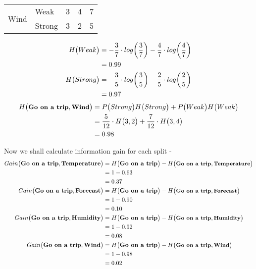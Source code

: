 \documentclass[11pt]{article}
\begin{document}
\begin{enumerate}
\begin{table}[!ht]
\begin{tabular}{|l|l|l|l|l|}
		\multirow{2}{*}{Wind}        & Weak          & 3                    & 4                   & 7                               \\ \cline{2-5} 
		& Strong        & 3                    & 2                   & 5                               \\ \hline
	\end{tabular}
\end{table}	
\begin{align*}
H \big(\small Weak\big) &= - \frac{3}{7} \cdot log \bigg(\frac{3}{7} \bigg) - \frac{4}{7} \cdot log \bigg(\frac{4}{7} \bigg) \\
&= 0.99 \\ 
H \big(\small Strong\big) &= - \frac{3}{5} \cdot log \bigg(\frac{3}{5} \bigg) - \frac{2}{5} \cdot log \bigg(\frac{2}{5} \bigg) \\
&= 0.97 
\end{align*}
\begin{align*}
H \big(\small \textbf{Go on a trip},\textbf{Wind}\big) &=  P \big( Strong \big) H \big(\small Strong \big) + P \big(Weak \big) H \big(\small Weak \big)  \\
&= \frac{5}{12} \cdot H \big(3, 2\big) + \frac{7}{12} \cdot H \big(3, 4\big)\\
&= 0.98
\end{align*}
	\end{enumerate}
Now we shall calculate information gain for each split -  
\begin{align*}
Gain \big(\textbf{Go on a trip},\textbf{Temperature}\big) &= H\big(\textbf{Go on a trip}\big) - H \big(\small \textbf{Go on a trip},\textbf{Temperature}\big) \\
&= 1 - 0.63 \\
&= 0.37 \\
Gain \big(\textbf{Go on a trip},\textbf{Forecast}\big) &= H\big(\textbf{Go on a trip}\big) - H \big(\small \textbf{Go on a trip},\textbf{Forecast}\big) \\
&= 1 - 0.90 \\
&= 0.10 \\
Gain \big(\textbf{Go on a trip},\textbf{Humidity}\big) &= H\big(\textbf{Go on a trip}\big) - H \big(\small \textbf{Go on a trip},\textbf{Humidity}\big) \\
&= 1 - 0.92 \\
&= 0.08 \\
Gain \big(\textbf{Go on a trip},\textbf{Wind}\big) &= H\big(\textbf{Go on a trip}\big) - H \big(\small \textbf{Go on a trip},\textbf{Wind}\big) \\
&= 1 - 0.98 \\
&= 0.02
\end{align*}
\end{document}
